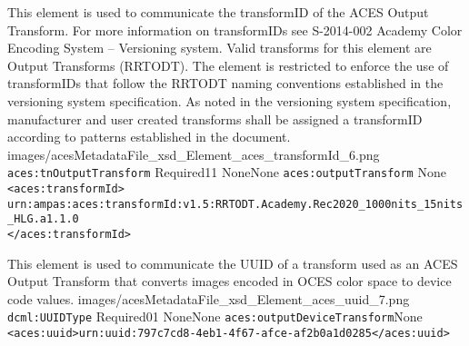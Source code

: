         {This element is used to communicate the transformID of the ACES Output Transform.  For more information on transformIDs see S-2014-002 Academy Color Encoding System -- Versioning system.  Valid transforms for this element are Output Transforms (RRTODT).  The element is restricted to enforce the use of transformIDs that follow the RRTODT naming conventions established in the versioning system specification.  As noted in the versioning system specification, manufacturer and user created transforms shall be assigned a transformID according to patterns established in the document.}
        {images/acesMetadataFile_xsd_Element_aces_transformId_6.png}
        {\texttt{aces:tnOutputTransform}}
        {Required}{1}{1}
        {None}{None}
        {\texttt{aces:outputTransform}}
        {None}
        {\lstinline{<aces:transformId>}\\
        \lstinline{urn:ampas:aces:transformId:v1.5:RRTODT.Academy.Rec2020_1000nits_15nits_HLG.a1.1.0}\\
        \lstinline{</aces:transformId>}}
        
		{This element is used to communicate the UUID of a transform used as an ACES Output Transform that converts images encoded in OCES color space to device code values.}
		{images/acesMetadataFile_xsd_Element_aces_uuid_7.png}
		{\texttt{dcml:UUIDType}}
		{Required}{0}{1}
		{None}{None}
		{\texttt{aces:outputDeviceTransform}}{None}
		{\lstinline{<aces:uuid>urn:uuid:797c7cd8-4eb1-4f67-afce-af2b0a1d0285</aces:uuid>}}